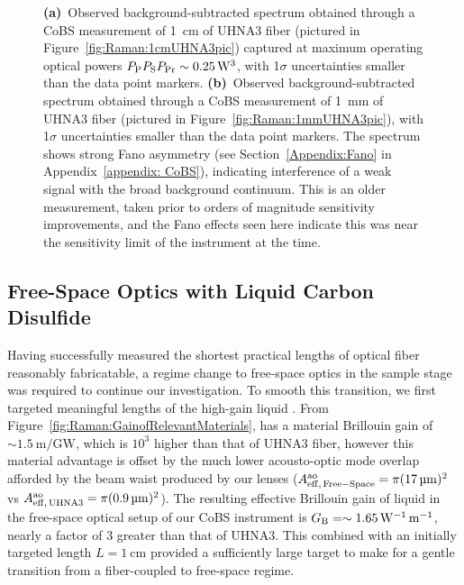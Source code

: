 \begin{figure}[t]
\begin{subfigure}[b]{0.49\textwidth}
    \label{fig:Raman:1mmUHNA3}
  \end{subfigure}
  \caption[\ac{CoBS} measurements of \SI{1}{\centi\meter} and \SI{1}{\milli\meter} \ac{UHNA3} fiber, in pursuit of observing Brillouin-induced Raman modes.]{\textbf{(a)}~Observed background-subtracted spectrum obtained through a \ac{CoBS} measurement of \SI{1}{\centi\meter} of \ac{UHNA3} fiber (pictured in Figure~\ref{fig:Raman:1cmUHNA3pic}) captured at maximum operating optical powers \(P_{\rm P}P_{\rm S}P_{\rm Pr} \sim \SI{0.25}{\cubic\watt}\), with 1\(\sigma\) uncertainties smaller than the data point markers. \textbf{(b)}~Observed background-subtracted spectrum obtained through a \ac{CoBS} measurement of \SI{1}{\milli\meter} of \ac{UHNA3} fiber (pictured in Figure~\ref{fig:Raman:1mmUHNA3pic}), with 1\(\sigma\) uncertainties smaller than the data point markers. The spectrum shows strong Fano asymmetry (see Section~\ref{Appendix:Fano} in Appendix~\ref{appendix: CoBS}), indicating interference of a weak signal with the broad background continuum. This is an older measurement, taken prior to orders of magnitude sensitivity improvements, and the Fano effects seen here indicate this was near the sensitivity limit of the instrument at the time.}
  \label{fig:Raman:UHNA3}
\end{figure}

\subsection{Free-Space Optics with Liquid Carbon Disulfide}
\label{subsec:Raman:Target:CS2Vial}

Having successfully measured the shortest practical lengths of optical fiber reasonably fabricatable, a regime change to free-space optics in the sample stage was required to continue our investigation. To smooth this transition, we first targeted meaningful lengths of the high-gain liquid . From Figure~\ref{fig:Raman:GainofRelevantMaterials},  has a material Brillouin gain of \(\sim\SI{1.5}{\meter\per\giga\watt}\), which is \(10^{3}\) higher than that of \ac{UHNA3} fiber, however this material advantage is offset by the much lower acousto-optic mode overlap afforded by the beam waist produced by our lenses (\(A_{\rm eff,\,Free-Space}^{\rm ao} = \pi(\SI{17}{\micro\meter})^{2}\) vs \(A_{\rm eff,\,UHNA3}^{\rm ao} = \pi(\SI{0.9}{\micro\meter})^{2}\)). The resulting effective Brillouin gain of liquid  in the free-space optical setup of our \ac{CoBS} instrument is \(G_{\rm B} = \sim\SI{1.65}{\per\watt\per\meter}\), nearly a factor of 3 greater than that of \ac{UHNA3}. This combined with an initially targeted length \(L = \SI{1}{\centi\meter}\) provided a sufficiently large target to make for a gentle transition from a fiber-coupled to free-space regime.

